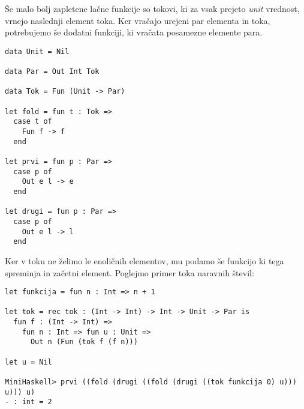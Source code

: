 \documentclass[12pt,a4paper,openany]{book}
\begin{document}
Še malo bolj zapletene lačne funkcije so tokovi, ki za vsak prejeto \emph{unit} vrednost, vrnejo naslednji element toka. Ker vračajo urejeni 
par elementa in toka, potrebujemo še dodatni funkciji, ki vračata posamezne elemente para.
\begin{lstlisting}
data Unit = Nil

data Par = Out Int Tok

data Tok = Fun (Unit -> Par)

let fold = fun t : Tok =>
  case t of
    Fun f -> f
  end

let prvi = fun p : Par =>
  case p of
    Out e l -> e
  end

let drugi = fun p : Par =>
  case p of
    Out e l -> l
  end
\end{lstlisting}
Ker v toku ne želimo le enoličnih elementov, mu podamo še funkcijo ki tega spreminja in začetni element. Poglejmo 
primer toka naravnih števil:
\begin{lstlisting}
let funkcija = fun n : Int => n + 1

let tok = rec tok : (Int -> Int) -> Int -> Unit -> Par is
  fun f : (Int -> Int) =>
    fun n : Int => fun u : Unit =>
      Out n (Fun (tok f (f n)))

let u = Nil

MiniHaskell> prvi ((fold (drugi ((fold (drugi ((tok funkcija 0) u))) u))) u)
- : int = 2
\end{lstlisting}
\end{document}
